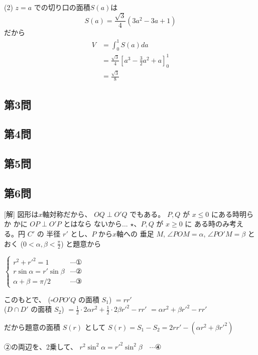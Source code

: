 \documentclass[../main.tex]{subfiles}
\begin{document}
(2) $z=a$ での切り口の面積$S(a)$は
\[ S(a) = \frac{\sqrt{3}}{4} (3a^2-3a+1) \]
だから
\begin{align*}
  V &= \int_0^1 S(a) da \\
  &= \frac{\sqrt{3}}{4} \left[ a^3 - \frac{3}{2}a^2 + a \right]_0^1 \\
  &= \frac{\sqrt{3}}{8}
\end{align*}

\subsection*{第3問}

\subsection*{第4問}

\subsection*{第5問}

\subsection*{第6問}
[解] 図形は$x$軸対称だから、
$OQ \perp O'Q$ でもある。
$P, Q$ が $x \le 0$ にある時明らか
かに $OP \perp O'P$ とはなら
ないから... $\star$、$P, Q$ が $x \ge 0$ に
ある時のみ考える。円 $C'$ の
半径 $r'$ とし、$P$ から$x$軸への
垂足 $M$, $\angle POM = \alpha$, $\angle PO'M = \beta$ とおく ($0 < \alpha, \beta < \frac{\pi}{2}$) と題意から

$
\begin{cases}
  r^2 + r'^2 = 1 & \cdots \text{①} \\
  r \sin \alpha = r' \sin \beta & \cdots \text{②} \\
  \alpha + \beta = \pi/2 & \cdots \text{③}
\end{cases}$

このもとで、
($\square OP O' Q$ の面積 $S_1$) $= r r'$ \\
($D \cap D'$ の面積 $S_2$) $= \frac{1}{2} \cdot 2\alpha r^2 + \frac{1}{2} \cdot 2\beta r'^2 - r r'$
$= \alpha r^2 + \beta r'^2 - r r'$

だから題意の面積 $S(r)$ として
$S(r) = S_1 - S_2 = 2 r r' - (\alpha r^2 + \beta r'^2)$

②の両辺を、2乗して、
$r^2 \sin^2 \alpha = r'^2 \sin^2 \beta \quad \cdots \text{④}$
\end{document}

